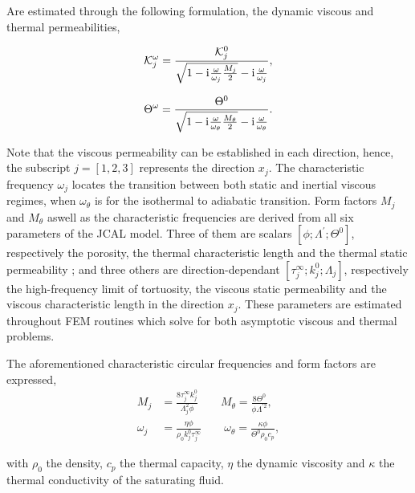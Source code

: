 \documentclass[a4paper,french,11pt]{article}
\newcommand{\ii}{\mathrm{i}\mkern1mu}
\begin{document}
Are estimated through the following formulation, the dynamic viscous and thermal permeabilities,

\begin{equation}
\mathcal{K}^\omega_j = \frac{\mathcal{K}_j^0}{\sqrt{1-\ii\frac{\omega}{\omega_j}\frac{M_j}{2}}-\ii\frac{\omega}{\omega_j}},
\end{equation}

\begin{equation}
\Theta^\omega = \frac{\Theta^0}{\sqrt{1-\ii\frac{\omega}{\omega_\theta}\frac{M_\theta}{2}}-\ii\frac{\omega}{\omega_\theta}}.
\end{equation}

Note that the viscous permeability can be established in each direction, hence, the subscript $j = [1,2,3]$ represents the direction $x_j$.
The characteristic frequency $\omega_j$ locates the transition between both static and inertial viscous regimes, when $\omega_\theta$ is for the isothermal to adiabatic transition. Form factors $M_j$ and $M_\theta$ aswell as the characteristic frequencies are derived from all six parameters of the JCAL model. Three of them are scalars $[\phi;\Lambda^\prime;\Theta^0]$, respectively the porosity, the thermal characteristic length and the thermal static permeability ; and three others are direction-dependant $[\tau_j^\infty;k^0_j;\Lambda_j]$, respectively the high-frequency limit of tortuosity, the viscous static permeability and the viscous characteristic length in the direction $x_j$.
These parameters are estimated throughout FEM routines which solve for both asymptotic viscous and thermal problems. 

The aforementioned characteristic circular frequencies and form factors are expressed,
\begin{align}
M_j &= \frac{8 \tau^\infty_j k_j^0}{\Lambda_j^2 \phi} \quad\quad
M_\theta = \frac{8\Theta^0}{\phi \Lambda^{\prime 2}},\\
\omega_j &= \frac{\eta \phi}{\rho_0 k^0_j \tau_j^\infty} \quad\quad
\omega_\theta = \frac{\kappa \phi}{\Theta^0 \rho_0 c_p},
\end{align}

with $\rho_0$ the density, $c_p$ the thermal capacity, $\eta$ the dynamic viscosity and $\kappa$ the thermal conductivity of the saturating fluid.
\end{document}
